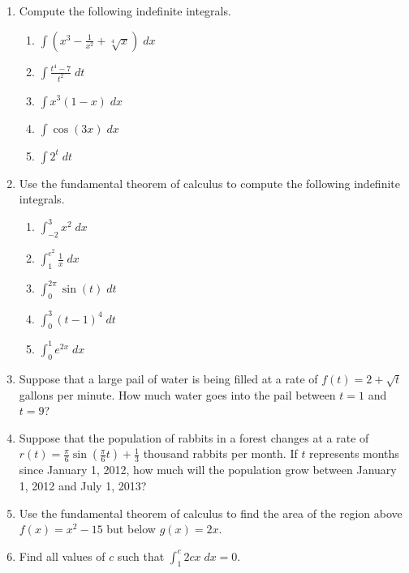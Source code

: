 \documentclass[11pt]{article}
\begin{document}
\drawtitle

\begin{enumerate}
  
\item Compute the following indefinite integrals.
  \begin{enumerate}
  \item $\displaystyle\int \left( x^3 - \frac{1}{x^2} +
      \sqrt[4]{x}\right)\;dx$
    \vfill
  \item $\displaystyle\int \frac{t^4-7}{t^2}\;dt$
    \vfill
  \item $\displaystyle\int x^3\left( 1 - x\right)\;dx$
    \vfill

    \newpage

  \item $\displaystyle\int \cos(3x)\;dx$
    \vfill

  \item $\displaystyle\int 2^t\;dt$
    \vfill
  \end{enumerate}
  
  \newpage

\item Use the fundamental theorem of calculus to compute the following
  indefinite integrals.
  \begin{enumerate}
  \item $\displaystyle\int_{-2}^3 x^2\;dx$
    \vfill
  \item $\displaystyle\int_1^{e^2} \frac{1}{x}\;dx$
    \vfill
  \item $\displaystyle\int_0^{2\pi} \sin(t)\;dt$
    \vfill

    \newpage
    
  \item $\displaystyle\int_0^3 (t-1)^4\;dt$
    \vfill

  \item $\displaystyle\int_0^1 e^{2x}\;dx$
    \vfill
  \end{enumerate}
  
  \newpage
  
\item Suppose that a large pail of water is being filled at a rate of
  $f(t) = 2+\sqrt{t}$ gallons per minute.  How much water goes into
  the pail between $t = 1$ and $t = 9$?
  
  \vfill

\item Suppose that the population of rabbits in a forest changes at a
  rate of $r(t) = \frac{\pi}{6}\sin\left(\frac{\pi}{6}t\right) +
  \frac{1}{3}$ thousand rabbits per month.  If $t$ represents months
  since January 1, 2012, how much will the population grow between
  January 1, 2012 and July 1, 2013?

  \vfill

  \newpage
  
\item Use the fundamental theorem of calculus to find the area of the
  region above $f(x) = x^2 - 15$ but below $g(x) = 2x$.
  
  \vfill

\item Find all values of $c$ such that $\displaystyle\int_{1}^c 2cx\; dx = 0$.

  \vfill

\end{enumerate}
\end{document}
